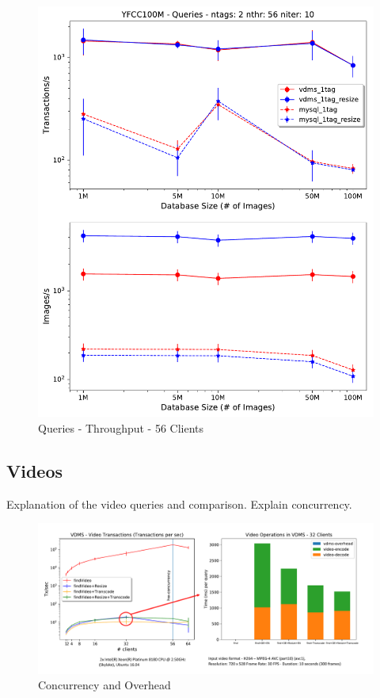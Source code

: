 \begin{figure}[t!]
\centering
\includegraphics[width=\columnwidth]{figures/queries_throughput_56}
\caption{Queries - Throughput - 56 Clients}
\label{fig:q_throughput_56}
\end{figure}

\subsection{Videos}

Explanation of the video queries and comparison.
Explain concurrency.

\begin{figure}[]
\centering
\includegraphics[width=\textwidth]{figures/video_overhead}
\caption{Concurrency and Overhead}
\label{fig:video}
\end{figure}

